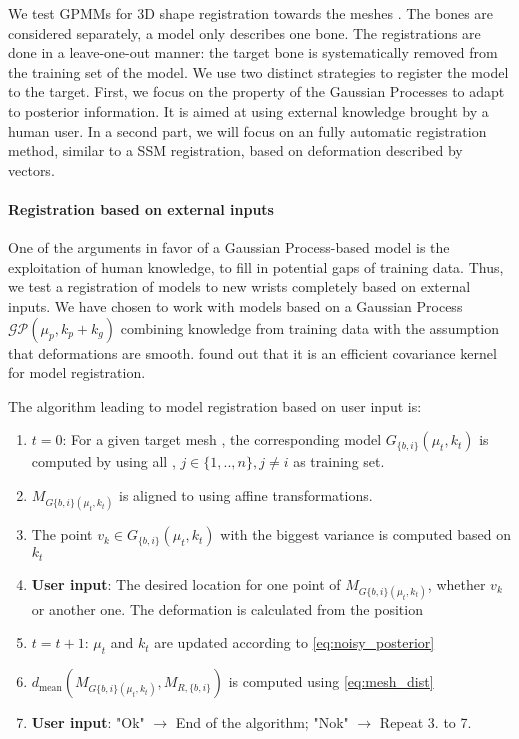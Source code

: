 We test GPMMs for 3D shape registration towards the \db* meshes \mr*. The bones are considered separately, a model only describes one bone. The registrations are done in a leave-one-out manner: the target bone is systematically removed from the training set of the model. We use two distinct strategies to register the model to the target. First, we focus on the property of the Gaussian Processes to adapt to posterior information. It is aimed at using external knowledge brought by a human user. In a second part, we will focus on an fully automatic registration method, similar to a SSM registration, based on deformation described by vectors. 


\paragraph{Registration based on external inputs}

One of the arguments in favor of a Gaussian Process-based model is the exploitation of human knowledge, to fill in potential gaps of training data. Thus, we test a registration of models to new wrists completely based on external inputs.
We have chosen to work with models based on a Gaussian Process $\mathcal{GP}(\mu_{p}, k_{p} + k_g)$ combining knowledge from training data with the assumption that deformations are smooth. \cite{luthi_2013_unified} found out that it is an efficient covariance kernel for model registration. 

The algorithm leading to model registration based on user input is:


\begin{enumerate}
	
	\item $t=0$: For a given target mesh \mr*, the corresponding model $G_{\{b,i\}}(\mu_t, k_t)$ is computed by using all \mw*, $j \in \{1, ..,n\}, j \neq i$  as training set.
	
	\item $M_{G{\{b,i\}}(\mu_t, k_t)}$ is aligned to \mr* using affine transformations. 
	
	\item The point $v_k \in G_{\{b,i\}}(\mu_t, k_t)$  with the biggest variance is computed based on $k_t$
	
	\item \textbf{User input}: The desired location for one point of $M_{G{\{b,i\}}(\mu_t, k_t)}$, whether $v_k$ or another one. The deformation is calculated from the position
	
	\item $t=t+1$: $\mu_{t}$ and $k_{t}$ are updated according to \eqref{eq:noisy_posterior}
	
	\item $d_\text{mean} (M_{G{\{b,i\}}(\mu_t, k_t)}, M_{R,\{b,i\}})$ is computed using \eqref{eq:mesh_dist}
	
	\item \textbf{User input}: "Ok" $\rightarrow$ End of the algorithm; "Nok" $\rightarrow$ Repeat 3. to 7.
\end{enumerate}

